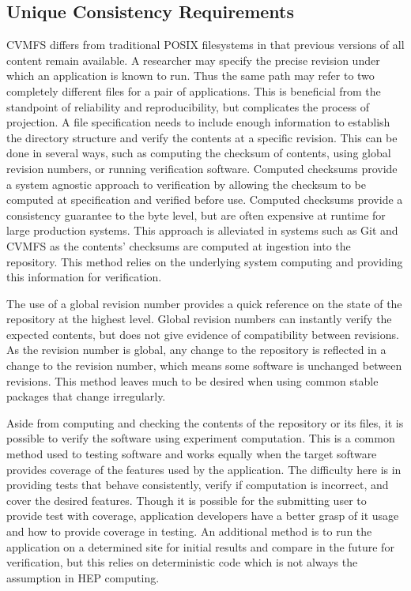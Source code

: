 \documentclass[sigconf]{acmart}
\begin{document}
\subsection{Unique Consistency Requirements}
CVMFS differs from traditional POSIX filesystems in that previous versions of all content remain available.
A researcher may specify the precise revision under which an application is known to run.
Thus the same path may refer to two completely different files for a pair of applications.
This is beneficial from the standpoint of reliability and reproducibility,
but complicates the process of projection.
A file specification needs to include enough information
to establish the directory structure and verify the contents at a specific revision.
This can be done in several ways, 
such as computing the checksum of contents,
using global revision numbers, 
or running verification software.
Computed checksums provide a system agnostic approach
to verification by allowing the checksum to be computed
at specification and verified before use.
Computed checksums provide a
consistency guarantee to the byte level,
but are often expensive at runtime for large
production systems.
This approach is alleviated in systems such as 
Git and CVMFS as the contents' checksums are 
computed at ingestion into the repository.
This method relies on the underlying system computing
and providing this information for verification.

The use of a global revision number provides a quick reference
on the state of the repository at the highest level.
Global revision numbers can instantly verify the expected
contents, but does not give evidence of compatibility between
revisions.
As the revision number is global, any change to the repository
is reflected in a change to the revision number, which means 
some software is unchanged between revisions.
This method leaves much to be desired when using common stable
packages that change irregularly.

Aside from computing and checking the contents of the
repository or its files, it is possible to verify the
software using experiment computation.
This is a common method used to testing software
and works equally when the target software provides
coverage of the features used by the application.
The difficulty here is in providing tests that
behave consistently, verify if computation is
incorrect, and cover the desired features.
Though it is possible for the submitting user
to provide test with coverage, application
developers have a better grasp of it usage
and how to provide coverage in testing.
An additional method is to run the application
on a determined site for initial results and
compare in the future for verification, but
this relies on deterministic code which is 
not always the assumption in HEP computing.
\end{document}
